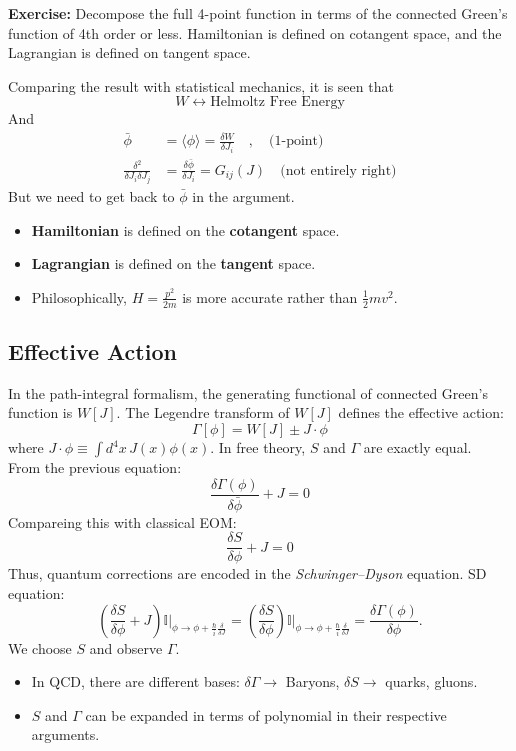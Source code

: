 \documentclass[14pt]{article} %
\begin{document}
\begin{framed}
\noindent \textbf{Exercise:} Decompose the full 4-point function in terms of the connected Green's function of 4th order or less.
Hamiltonian is defined on cotangent space, and the Lagrangian is defined on tangent space.
\end{framed}
Comparing the result with statistical mechanics, it is seen that
\[
W \leftrightarrow \text{Helmoltz Free Energy}
\]
And 
\begin{align*}
\bar{\phi} &= \langle\phi \rangle = \frac{\delta W}{\delta J_i} \quad , \quad \text{(1-point)}
\\
\frac{\delta^2}{\delta J_i \delta J_j} &= \frac{\delta \bar{\phi}}{\delta J_i} = G_{ij}(J) \quad \text{(not entirely right)}
\end{align*}
But we need to get back to $\bar{\phi}$ in the argument.
\begin{tcolorbox}
\begin{itemize}
    \item \textbf{Hamiltonian} is defined on the \textbf{cotangent} space.
    \item \textbf{Lagrangian} is defined on the \textbf{tangent} space.
    \item Philosophically, $H = \frac{p^2}{2m}$ is more accurate rather than $\frac12 mv^2$.
\end{itemize}
\end{tcolorbox}

\subsection{Effective Action}
In the path-integral formalism, the generating functional of connected Green’s function is $W[J]$. The Legendre transform of $W[J]$ defines the effective action:
\[
\Gamma[\phi] = W[J] \pm J \cdot \phi
\]
where $J \cdot \phi \equiv \int d^4 x \, J(x)\phi(x)$.
In free theory, $S$ and $\Gamma$ are exactly equal. \\

From the previous equation:
\[
\frac{\delta \Gamma(\phi)}{\delta \bar{\phi}} + J = 0
\]
Compareing this with classical EOM:
\[
\frac{\delta S}{\delta \phi} + J = 0
\]
Thus, quantum corrections are encoded in the \textit{Schwinger–Dyson} equation. SD equation:
\[
\left( \frac{\delta S}{\delta \phi} + J \right) \mathbb{I}\Bigg|_{\phi \to \phi + \frac{\hbar}{i}\frac{\delta}{\delta J}}
= \left( \frac{\delta S}{\delta \phi} \right) \mathbb{I}\Bigg|_{\phi \to \phi + \frac{\hbar}{i}\frac{\delta}{\delta J}} 
=
\frac{\delta \Gamma(\phi)}{\delta \phi}.
\]
We choose $S$ and observe $\Gamma$. 
\begin{tcolorbox}
\begin{itemize}
    \item In QCD, there are different bases: $\delta \Gamma \rightarrow$ Baryons, $\delta S \rightarrow$ quarks, gluons.
    \item $S$ and $\Gamma$ can be expanded in terms of polynomial in their respective arguments.
\end{itemize}
\end{tcolorbox}
\end{document}
